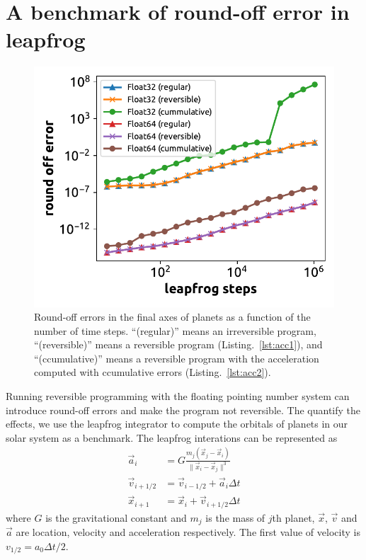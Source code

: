 \documentclass{article}
\newcommand{\<}{\langle}
\renewcommand{\>}{\rangle}
\newcommand{\Lst}[1]{Listing.~\ref{#1}}
\theoremstyle{definition}\newtheorem{definition}{\textit{Definition}}
\begin{document}
\section{A benchmark of round-off error in leapfrog}\label{app:roundoff}


\begin{figure}
    \centerline{\includegraphics[width=0.5\columnwidth,trim={0 0cm 0 0},clip]{fig11.pdf}}
    \caption{Round-off errors in the final axes of planets as a function of the number of time steps. ``(regular)'' means an irreversible program, ``(reversible)'' means a reversible program (\Lst{lst:acc1}), and ``(ccumulative)'' means a reversible program with the acceleration computed with ccumulative errors (\Lst{lst:acc2}).}\label{fig:leapfrog}
\end{figure}
Running reversible programming with the floating pointing number system can introduce round-off errors and make the program not reversible. The quantify the effects, we use the leapfrog integrator to compute the orbitals of planets in our solar system as a benchmark. The leapfrog interations can be represented as
\begin{align}
    \vec a_i &= G\frac{m_j (\vec x_j-\vec x_i)}{\|\vec x_i - \vec x_j\|^3}\\
    \vec v_{i+1/2} &= \vec v_{i-1/2} + \vec a_{i} \Delta t\\
    \vec x_{i+1} &= \vec x_i + \vec v_{i+1/2}\Delta t
\end{align}
where $G$ is the gravitational constant and $m_j$ is the mass of $j$th planet, $\vec x$, $\vec v$ and $\vec a$ are location, velocity and acceleration respectively. The first value of velocity is $v_{1/2} = a_0 \Delta t/2$.
\end{document}
